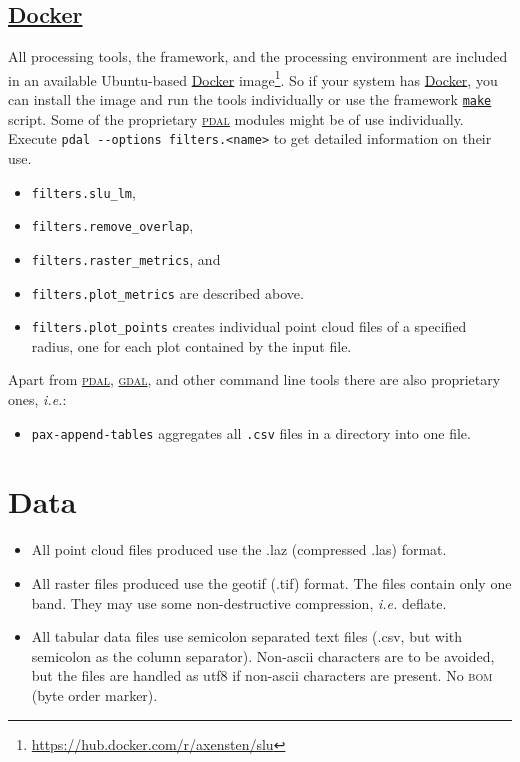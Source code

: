\documentclass[english,a4paper,minion,nofigsidecaption]{article}
\newcommand{\dockerhub}{\url{https://hub.docker.com/r/axensten/slu}}
\providecommand{\ie}{\textit{i.e.}}
\providecommand{\abbr}[1]{\texorpdfstring{\textsc{\MakeLowercase{#1}}}{#1}}
\newcommand{\make}{\href{https://www.gnu.org/software/make/}{\texttt{make}}}
\newcommand{\pdal}{\href{https://www.pdal.io}{\textsc{pdal}}}
\newcommand{\gdal}{\href{https://www.gdal.org}{\textsc{gdal}}}
\newcommand{\docker}{\href{https://www.docker.org}{Docker}}
\begin{document}
\subsection{{\docker}}
All processing tools, the framework, and the processing environment are included in an available Ubuntu-based {\docker} image\footnote{\dockerhub}. So if your system has {\docker}, you can install the image and run the tools individually or use the framework {\make} script. Some of the proprietary {\pdal} modules might be of use individually. Execute \verb|pdal --options filters.<name>| to get detailed information on their use. 
\begin{itemize}
	\item \texttt{filters.slu\_lm}, 
	\item \texttt{filters.remove\_overlap}, 
	\item \texttt{filters.raster\_metrics}, and 
	\item \texttt{filters.plot\_metrics} are described above.
	\item \texttt{filters.plot\_points} creates individual point cloud files of a specified radius, one for each plot contained by the input file.
\end{itemize}

{\noindent}Apart from {\pdal}, {\gdal}, and other command line tools there are also proprietary ones, {\ie}:
\begin{itemize}
	\item \texttt{pax-append-tables} aggregates all \texttt{.csv} files in a directory into one file. 
\end{itemize}


\section{Data}

\begin{itemize}
	\item All point cloud files produced use the .laz (compressed .las) format.
	\item All raster files produced use the geotif (.tif) format. The files contain only one band. They may use some non-destructive compression, {\ie} deflate. 
	\item All tabular data files use semicolon separated text files (.csv, but with semicolon as the column separator). Non-ascii characters are to be avoided, but the files are handled as utf8 if non-ascii characters are present. No \abbr{BOM} (byte order marker). 
\end{itemize}
\end{document}
